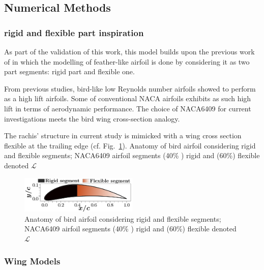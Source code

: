
\subsection{Numerical Methods}



\subsubsection{rigid and flexible part inspiration}
As part of the validation of this work, this model builds upon the previous work of \citet{Gamble2020b} in which the modelling of feather-like airfoil is done by considering it as two part segments: rigid part and flexible one.

From previous studies, bird-like low Reynolds number airfoils \cite{Boughou2022NumericalAirfoils} showed to perform as a high lift airfoils.
%
Some of conventional NACA airfoils exhibits as such high lift in terms of aerodynamic performance.
%
The choice of NACA6409 for current investigations meets the bird wing cross-section analogy.




The rachis' structure in current study is mimicked with a wing cross section flexible at the trailing edge (cf. Fig.~\ref{fig:segments}).
%
Anatomy of bird airfoil considering rigid and flexible segments; NACA6409 airfoil segments (40\% ) rigid and (60\%) flexible denoted $\mathcal{L}$

\begin{figure}[ht!]
\centering
\includegraphics[width=0.5\textwidth]{figs/segments_airfoil.pdf}
\caption{Anatomy of bird airfoil considering rigid and flexible segments; NACA6409 airfoil segments (40\% ) rigid and (60\%) flexible denoted $\mathcal{L}$}
\label{fig:segments}
\end{figure}





\subsubsection{Wing Models}

